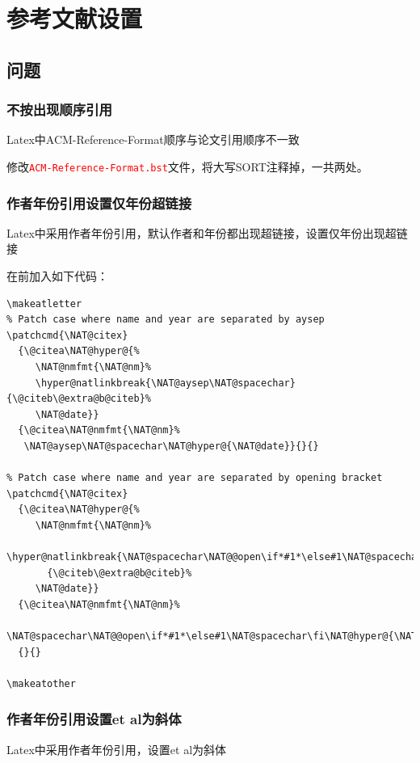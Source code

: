 \chapter{参考文献设置}\label{chap:ref}
\section{问题}

\subsection{不按出现顺序引用}\label{subsec:not-in-order}
Latex中ACM-Reference-Format顺序与论文引用顺序不一致

修改\textcolor{red}{\lstinline{ACM-Reference-Format.bst}}文件，将大写SORT注释掉，一共两处。

\subsection{作者年份引用设置仅年份超链接}\label{subsec:year-only}
Latex中采用作者年份引用，默认作者和年份都出现超链接，设置仅年份出现超链接

在\lstinline||前加入如下代码：
\begin{lstlisting}
\makeatletter
% Patch case where name and year are separated by aysep
\patchcmd{\NAT@citex}
  {\@citea\NAT@hyper@{%
     \NAT@nmfmt{\NAT@nm}%
     \hyper@natlinkbreak{\NAT@aysep\NAT@spacechar}{\@citeb\@extra@b@citeb}%
     \NAT@date}}
  {\@citea\NAT@nmfmt{\NAT@nm}%
   \NAT@aysep\NAT@spacechar\NAT@hyper@{\NAT@date}}{}{}

% Patch case where name and year are separated by opening bracket
\patchcmd{\NAT@citex}
  {\@citea\NAT@hyper@{%
     \NAT@nmfmt{\NAT@nm}%
     \hyper@natlinkbreak{\NAT@spacechar\NAT@@open\if*#1*\else#1\NAT@spacechar\fi}%
       {\@citeb\@extra@b@citeb}%
     \NAT@date}}
  {\@citea\NAT@nmfmt{\NAT@nm}%
   \NAT@spacechar\NAT@@open\if*#1*\else#1\NAT@spacechar\fi\NAT@hyper@{\NAT@date}}
  {}{}

\makeatother
\end{lstlisting}

\subsection{作者年份引用设置et al为斜体}\label{subsec:et-al-italic}
Latex中采用作者年份引用，设置et al为斜体

